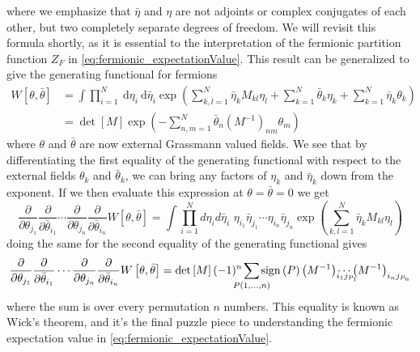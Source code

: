 \documentclass[a4paper,10pt]{book}
\begin{document}
where we emphasize that $\bar{\eta}$ and $\eta$ are not adjoints or complex conjugates of each other, but two completely separate degrees of freedom. We will revisit this formula shortly, as it is essential to the interpretation of the fermionic partition function $Z_F$ in \eqref{eq:fermionic_expectationValue}.
This result can be generalized to give the generating functional for fermions
\begin{equation}
\begin{aligned}
W[\theta, \bar{\theta}] &=\int \prod_{i=1}^{N} \mathrm{~d} \eta_{i} \mathrm{~d} \bar{\eta}_{i} \exp \left(\sum_{k, l=1}^{N} \bar{\eta}_{k} M_{k l} \eta_{l}+\sum_{k=1}^{N} \bar{\theta}_{k} \eta_{k}+\sum_{k=1}^{N} \bar{\eta}_{k} \theta_{k}\right) \\
&=\operatorname{det}[M] \exp \left(-\sum_{n, m=1}^{N} \bar{\theta}_{n}\left(M^{-1}\right)_{n m} \theta_{m}\right)
\end{aligned}
\end{equation}
where $\theta$ and $\bar{\theta}$ are now external Grassmann valued fields. We see that by differentiating the first equality of the generating functional with respect to the external fields $\theta_k$ and $\bar{\theta}_k$, we can bring any factors of $\eta_k$ and $\bar{\eta}_k$ down from the exponent. If we then evaluate this expression at $\theta = \bar{\theta}=0$ we get
\begin{equation}\label{eq:f_exp_val_from_generatingFunctional}
\frac{\partial}{\partial \theta_{j_1}}\frac{\partial}{\partial \bar{\theta}_{i_1}}\cdots\frac{\partial}{\partial \theta_{j_n}}\frac{\partial}{\partial \bar{\theta}_{i_n}}W\left[ \theta,\bar{\theta} \right]=\int \prod_{i=1}^{N} d\eta_{i} d\bar{\eta}_{i} \,\, \eta_{i_1}\bar{\eta}_{j_1}\cdots\eta_{i_n}\bar{\eta}_{j_n}\exp \left(\sum_{k, l=1}^{N} \bar{\eta}_{k} M_{k l} \eta_{l}\right)
\end{equation}
doing the same for the second equality of the generating functional gives
\begin{equation}\label{eq:F_exp_val_as_permutations_of_propagators}
\frac{\partial}{\partial \theta_{j_1}}\frac{\partial}{\partial \bar{\theta}_{i_1}}\cdots\frac{\partial}{\partial \theta_{j_n}}\frac{\partial}{\partial \bar{\theta}_{i_n}}W\left[ \theta,\bar{\theta} \right]=\operatorname{det}\left[ M \right](-1)^n \mkern-18mu\sum\limits_{P(1,\ldots,n)}\mkern-18mu\operatorname{sign}\left( P \right)\left( M^{-1} \right)_{i_1j_{P_1}}\mkern-18mu\mkern-18mu\cdots\left( M^{-1} \right)_{i_nj_{P_n}}
\end{equation}
where the sum is over every permutation $n$ numbers.
This equality is known as Wick's theorem, and it's the final puzzle piece to understanding the fermionic expectation value in \eqref{eq:fermionic_expectationValue}.
\end{document}
